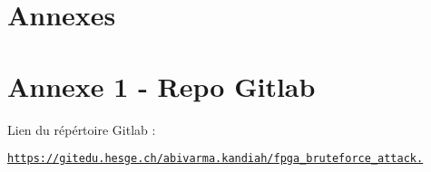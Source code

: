 \stopcontents[default]
\resumecontents[annexes]
\chapter*{Annexes}

\chapter*{Annexe 1 - Repo Gitlab}

Lien du répértoire Gitlab :

\href{https://gitedu.hesge.ch/abivarma.kandiah/fpga_bruteforce_attack}{\texttt{https://gitedu.hesge.ch/abivarma.kandiah/fpga\_bruteforce\_attack.}}


\stopcontents[annexes]
\resumecontents[default]
